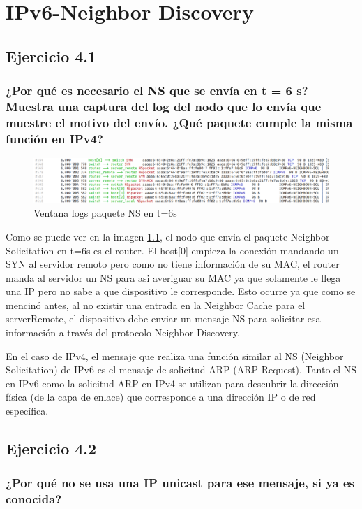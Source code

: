 \chapter{IPv6-Neighbor Discovery}
\label{chap:ipv6_nd}

\section{Ejercicio 4.1}
\subsection{¿Por qué es necesario el NS que se envía en t = 6 s? Muestra una captura del log del nodo que lo envía que muestre el motivo del envío. ¿Qué paquete cumple la misma función en IPv4?}

\begin{figure}[H]
    \centering   
    \includegraphics[width=135mm, scale=0.75]{imaxes/captura_ejer4_1.png}
    \caption{Ventana logs paquete NS en t=6s}
    \label{fig:logs_ns_t6}
\end{figure}

Como se puede ver en la imagen \ref{fig:logs_ns_t6}, el nodo que envia el paquete Neighbor Solicitation en t=6s es el router. El host[0] empieza la conexión mandando un SYN al servidor remoto pero como no tiene información de su MAC, el router manda al servidor un NS para asi averiguar su MAC ya que solamente le llega una IP pero no sabe a que dispositivo le corresponde. Esto ocurre ya que como se mencinó antes, al no existir una entrada en la Neighbor Cache para el serverRemote, el dispositivo debe enviar un mensaje NS para solicitar esa información a través del protocolo Neighbor Discovery.

En el caso de IPv4, el mensaje que realiza una función similar al NS (Neighbor Solicitation) de IPv6 es el mensaje de solicitud ARP (ARP Request). Tanto el NS en IPv6 como la solicitud ARP en IPv4 se utilizan para descubrir la dirección física (de la capa de enlace) que corresponde a una dirección IP o de red específica.

\section{Ejercicio 4.2}
\subsection{¿Por qué no se usa una IP unicast para ese mensaje, si ya es conocida?}

